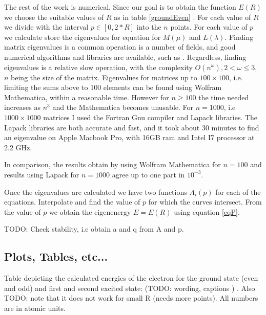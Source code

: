 The rest of the work is numerical. Since our goal is to obtain the function $ E(R) $ we choose the suitable values of $ R $ as in table \ref{groundEven} . For each value of $ R $ we divide with the interval $ p \in [0,2*R] $ into the $ n $ points. For each value of $ p $ we calculate store the eigenvalues for equation for $ M(\mu) $ and $ L(\lambda) $. Finding matrix eigenvalues is a common operation is a number of fields, and good numerical algorithms and libraries are available, such as \cite{Lapack1}.  Regardless, finding eigenvalues is a relative slow operation, with the complexity $ O(n^\omega), 2 < \omega \le 3 $, \cite{Lapack1} $ n $ being the size of the matrix.  Eigenvalues for matrices up to $ 100 \times 100 $, i.e. limiting the sums above to 100 elements can be found using Wolfram Mathematica, within a reasonable time. However for $ n \ge 100 $ the time needed increases as $ n^3 $ \cite{QRDecomposition1} \cite{LinearAlgebra1} and the Mathematica becomes unusable. For $  n = 1000 $, i.e $ 1000 \times 1000  $ matrices I used the Fortran Gnu compiler and Lapack \cite{Lapack1} libraries. The Lapack libraries are both accurate and fast, and it took about 30 minutes to find an eigenvalue on Apple Macbook Pro, with 16GB ram and Intel I7 processor at 2.2 GHz.

In comparison, the results obtain by using Wolfram Mathematica for $ n = 100 $ and results using Lapack for $ n = 1000 $  agree up to one part in $ 10^{-3} $.

Once the eigenvalues are calculated we have two functions $ A_i(p) $ for each of the equations. Interpolate and find the value of $ p $ for which the curves intersect. From the value of $ p $ we obtain the eigenenergy $ E = E(R) $ using equation \eqref{eqP}.

TODO: Check stability, i.e obtain a and q from A and p.

\subsection{Plots, Tables, etc... }

Table depicting the calculated energies of the electron for the ground state (even and odd) and first and second excited state: (TODO: wording, captions ) . Also TODO: note that it does not work for small R (needs more points). All numbers are in atomic units.

